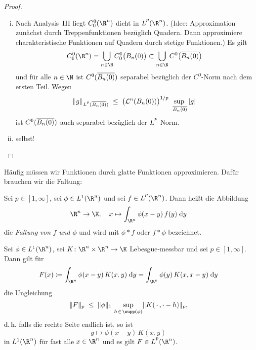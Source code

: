 \begin{proof}
\begin{enumerate}[(i)]
        \item
            Nach Analysis~III liegt $\Coo(\R^n)$ dicht in $\Lpp(\R^n)$. %
            (Idee: Approximation zunächst durch Treppenfunktionen bezüglich Quadern.
            Dann approximiere charakteristische Funktionen auf Quadern durch
            stetige Funktionen.)
            Es gilt
            \[ \Coo(\R^n) = \bigcup_{n\in\N} \Coo\bigl(B_n(0)\bigr)
                \subset \bigcup_{n\in\N} C^0\bigl( \setclosure{B_n(0)} \bigr)
            \]
            und für alle $n\in\N$ ist $C^0(\overline{B_n(0)})$ separabel bezüglich
            der $C^0$-Norm nach dem ersten Teil. Wegen
            \[ \norm{g}_{\Lpp(\setclosure{B_n(0)})} \;\leq\;
                \bigl( \leb^n(B_n(0)) \bigr)^{1/p} \,
                \sup_{\;\setclosure{B_n(0)}}\,\abs{g} 
            \]
            ist $C^0(\overline{B_n(0)})$ auch separabel bezüglich der
            $\Lpp$-Norm.
            
        \item
            selbst!
    \end{enumerate}
\end{proof}

\pagebreak[2]
Häufig müssen wir Funktionen durch glatte Funktionen approximieren. Dafür
brauchen wir die Faltung:
%
\begin{thDef}[Faltung]
    Sei $p\in[1,\infty]$, sei $\phi\in\Lp1(\R^n)$ und sei $f\in\Lpp(\R^n)$.
    Dann heißt die Abbildung
    \[ \R^n\to\K, \quad x\mapsto \int_{\R^n} \phi(x-y) \, f(y) \dif{y}
    \]
    die \emph{Faltung von $f$ und $\phi$} und wird mit $\phi\ast f$ oder
    $f\ast\phi$ bezeichnet.
\end{thDef}

\begin{thLemma} \label{vl26:lemma10.16}
    Sei $\phi\in\Lp1(\R^n)$, sei $K\colon\R^n\times\R^n\to\K$ Lebesgue-messbar
    und sei $p\in[1,\infty]$. Dann gilt für
    \[ F(x) \defeq \int_{\R^n} \phi(x-y) \, K(x,y) \dif{y} 
        = \int_{\R^n} \phi(y) \, K(x,x-y) \dif{y}
    \]
    die Ungleichung
    \[ \norm{F}_p \;\leq\; \norm{\phi}_1 \, \sup_{h\mkern2mu\in\mkern2mu\supp(\phi)}
        \norm{K(\scdot,\cdot-h)}_p
    , \]
    d.\,h. falls die rechte Seite endlich ist, so ist
    \[ y\mapsto \phi(x-y) \, K(x,y) \]
    in $\Lp1(\R^n)$ für fast alle $x\in\R^n$ und es gilt $F\in\Lpp(\R^n)$.
\end{thLemma}

